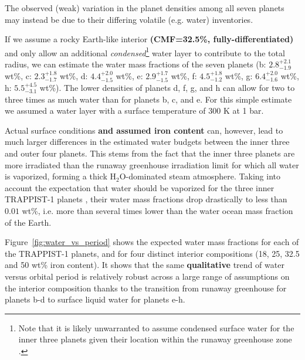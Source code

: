 \documentclass[twocolumn]{aastex63}
\begin{document}
The observed (weak) variation in the planet densities among all seven planets may instead be due to their differing volatile (e.g. water) inventories.

If we assume a rocky Earth-like interior \textbf{(CMF=32.5\%, fully-differentiated)} and only allow an additional {\it condensed}\footnote{Note that it is likely unwarranted to assume condensed surface water for the inner three planets given their location within the runaway greenhouse zone \citep{Turbet2020}.} water layer to contribute to the total radius, we can estimate the water mass fractions of the seven planets (b: $\mathbf{2.8^{+2.1}_{-1.9}}$ wt\%, c: $\mathbf{2.3^{+1.8}_{-1.7}}$ wt\%, d: $\mathbf{4.4^{+2.0}_{-1.5}}$ wt\%, e: $\mathbf{2.9^{+1.7}_{-1.5}}$ wt\%, f: $\mathbf{4.5^{+1.8}_{-1.2}}$ wt\%, g: $\mathbf{6.4^{+2.0}_{-1.6}}$  wt\%, h: $\mathbf{5.5^{+4.5}_{-3.1}}$ wt\%).
The lower densities of planets d, f, g, and h can allow for two to three times as much water than for planets b, c, and e. For this simple estimate we assumed a water layer with a surface temperature of 300 K at 1 bar.

Actual surface conditions \textbf{and assumed iron content} can, however, lead to much larger differences in the estimated water budgets between the inner three and outer four planets. This stems from the fact that the inner three planets are more irradiated than the runaway greenhouse irradiation limit \citep{Kopparapu2013,Wolf2017,Turbet2018} for which all water is vaporized, forming a thick H$_2$O-dominated steam atmosphere. Taking into account the expectation that water should be vaporized for the three inner TRAPPIST-1 planets \citep{Turbet2019,Turbet2020}, their water mass fractions drop drastically to less than $0.01$ wt\%, i.e. more than several times lower than the water ocean mass fraction of the Earth.

Figure~\ref{fig:water_vs_period} shows the expected water mass fractions for each of the TRAPPIST-1 planets, and for four distinct interior compositions (18, 25, 32.5 and 50 wt\% iron content). It shows that the same \textbf{qualitative} trend of water versus orbital period is relatively robust across a large range of assumptions on the interior composition thanks to the transition from runaway greenhouse for planets b-d to surface liquid water for planets e-h.  %
\end{document}

